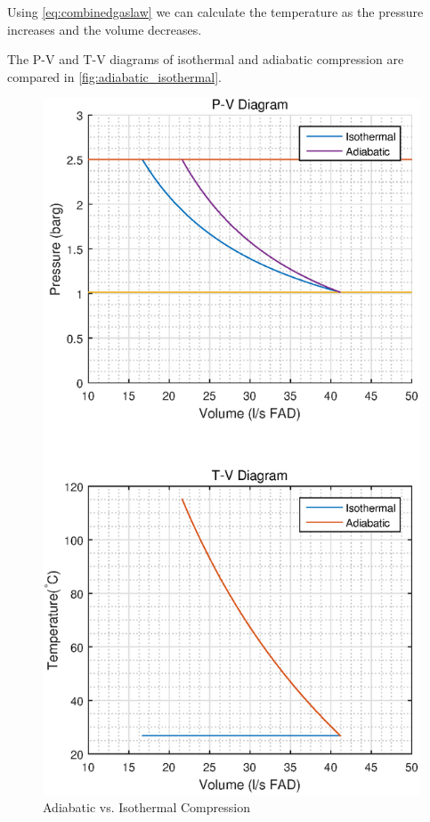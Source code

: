 \documentclass{article}
\begin{document}
Using \autoref{eq:combinedgaslaw} we can calculate the temperature as the pressure increases and the volume decreases.

The P-V and T-V diagrams of isothermal and adiabatic compression are compared in \autoref{fig:adiabatic_isothermal}.

\begin{figure}
\includegraphics[width = \textwidth]{Adiabatic_Isothermal.eps}
\caption{Adiabatic vs. Isothermal Compression}
\label{fig:adiabatic_isothermal}
\end{figure}
\end{document}
